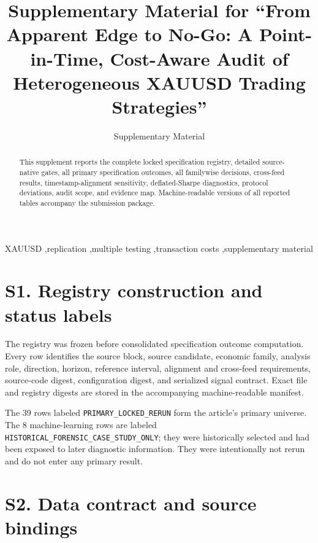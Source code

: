 \documentclass[a4paper,fleqn]{cas-sc}
\begin{document}
\title[mode=title]{Supplementary Material for ``From Apparent Edge to No-Go: A Point-in-Time, Cost-Aware Audit of Heterogeneous XAUUSD Trading Strategies''}
\author[1]{Supplementary Material}

\begin{abstract}
This supplement reports the complete locked specification registry, detailed source-native gates, all primary specification outcomes, all familywise decisions, cross-feed results, timestamp-alignment sensitivity, deflated-Sharpe diagnostics, protocol deviations, audit scope, and evidence map. Machine-readable versions of all reported tables accompany the submission package.
\end{abstract}
\begin{keywords}
XAUUSD \sep replication \sep multiple testing \sep transaction costs \sep supplementary material
\end{keywords}
\maketitle

\section*{S1. Registry construction and status labels}

The registry was frozen before consolidated specification outcome computation. Every row identifies the source block, source candidate, economic family, analysis role, direction, horizon, reference interval, alignment and cross-feed requirements, source-code digest, configuration digest, and serialized signal contract. Exact file and registry digests are stored in the accompanying machine-readable manifest.

The 39 rows labeled \texttt{PRIMARY\_LOCKED\_RERUN} form the article's primary universe. The 8 machine-learning rows are labeled \texttt{HISTORICAL\_FORENSIC\_CASE\_STUDY\_ONLY}; they were historically selected and had been exposed to later diagnostic information. They were intentionally not rerun and do not enter any primary result.



\section*{S2. Data contract and source bindings}
\end{document}
